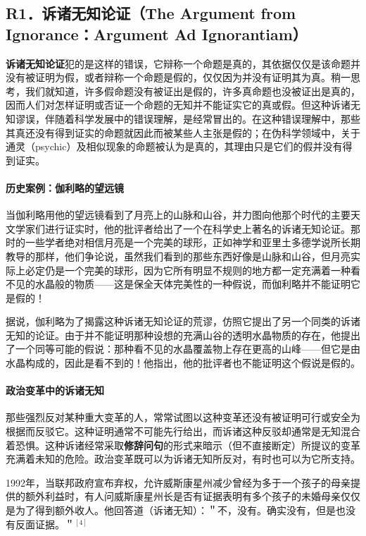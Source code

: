 \subsection{R1．诉诸无知论证（The Argument from Ignorance：Argument Ad Ignorantiam）}

\textbf{诉诸无知论证}犯的是这样的错误，它辩称一个命题是真的，其依据仅仅是该命题并没有被证明为假，或者辩称一个命题是假的，仅仅因为并没有证明其为真。稍一思考，我们就知道，许多假命题没有被证出是假的，许多真命题也没被证出是真的，因而人们对怎样证明或否证一个命题的无知并不能证实它的真或假。但这种诉诸无知谬误，伴随着科学发展中的错误理解，是经常冒出的。在这种错误理解中，那些其真还没有得到证实的命题就因此而被某些人主张是假的；在伪科学领域中，关于通灵（psychic）及相似现象的命题被认为是真的，其理由只是它们的假并没有得到证实。

\paragraph{历史案例：伽利略的望远镜}
当伽利略用他的望远镜看到了月亮上的山脉和山谷，并力图向他那个时代的主要天文学家们进行证实时，他的批评者给出了一个在科学史上著名的诉诸无知论证。那时的一些学者绝对相信月亮是一个完美的球形，正如神学和亚里土多德学说所长期教导的那样，他们争论说，虽然我们看到的那些东西好像是山脉和山谷，但月亮实际上必定仍是一个完美的球形，因为它所有明显不规则的地方都一定充满着一种看不见的水晶般的物质——这是保全天体完美性的一种假说，而伽利略并不能证明它是假的！

据说，伽利略为了揭露这种诉诸无知论证的荒谬，仿照它提出了另一个同类的诉诸无知的论证。由于并不能证明那种设想的充满山谷的透明水晶物质的存在，他提出了一个同等可能的假说：那种看不见的水晶覆盖物上存在更高的山峰——但它是由水晶构成的，因此是看不到的！他指出，他的批评者也不能证明这个假说是假的。

\paragraph{政治变革中的诉诸无知}
那些强烈反对某种重大变革的人，常常试图以这种变革还没有被证明可行或安全为根据而反驳它。这种证明通常不可能先行给出，而诉诸这种反驳却通常是无知混合着恐惧。这种诉诸经常采取\textbf{修辞问句}的形式来暗示（但不直接断定）所提议的变革充满着未知的危险。政治变革既可以为诉诸无知所反对，有时也可以为它所支持。

1992年，当联邦政府宣布弃权，允许威斯康星州减少曾经为多于一个孩子的母亲提供的额外利益时，有人问威斯康星州长是否有证据表明有多个孩子的未婚母亲仅仅是为了得到额外收人。他回答道（诉诸无知）：＂不，没有。确实没有，但是也没有反面证据。＂${ }^{[4]}$

